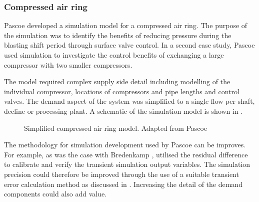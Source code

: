 \subsubsection{Compressed air ring}
Pascoe \cite{Pascoe2016Masters} developed a simulation model for a compressed air ring. The purpose of the simulation was to identify the benefits of reducing pressure during the blasting shift period through surface valve control. In a second case study, Pascoe used simulation to investigate the control benefits of exchanging a large compressor with two smaller compressors.
\par 
 The model required complex supply side detail including modelling of the individual compressor, locations of compressors and pipe lengths and control valves. The demand aspect of the system was simplified to a single flow per shaft, decline or processing plant. A schematic of the simulation model is shown in .
 \par
\begin{figure}[h!]
	\centering
	\caption[Simplified compressed air ring model]{Simplified compressed air ring model. Adapted from Pascoe \cite{Pascoe2016Masters}}
	\label{fig:Pascoe model}
\end{figure}
The methodology for simulation development used by Pascoe can be improves. For example, as was the case with Bredenkamp \cite{Bredenkamp2013Masters}, \cite{Pascoe2016Masters} utilised the residual difference to calibrate and verify the transient simulation output variables. The simulation precision could therefore be improved through the use of a suitable transient error calculation method as discussed in . Increasing the detail of the demand components could also add value.

